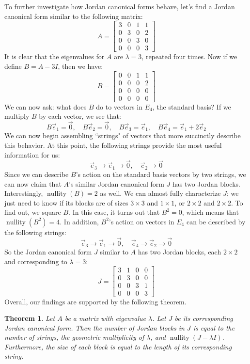 \documentclass[11pt]{amsart}
\newtheorem{theorem}{Theorem}[section]
\theoremstyle{definition}
\DeclareMathOperator{\nullity}{nullity}
\begin{document}
To further investigate how Jordan canonical forms behave, let's find a Jordan canonical form similar to the following matrix:
\[
	A = \begin{bmatrix} 3 & 0 & 1 & 1 \\ 0 & 3 & 0 & 2 \\ 0 & 0 & 3 & 0 \\ 0 & 0 & 0 & 3 \end{bmatrix}
\]
It is clear that the eigenvalues for $A$ are $\lambda = 3$, repeated four times. Now if we define $B = A - 3I$, then we have:
\[
	B = \begin{bmatrix} 0 & 0 & 1 & 1 \\ 0 & 0 & 0 & 2 \\ 0 & 0 & 0 & 0 \\ 0 & 0 & 0 & 0 \end{bmatrix}
\]
We can now ask: what does $B$ do to vectors in $E_4$, the standard basis? If we multiply $B$ by each vector, we see that:
\[
	B\vec{e}_1 = \vec{0}, \quad B\vec{e}_2 = \vec{0}, \quad B\vec{e}_3 = \vec{e}_1, \quad B\vec{e}_4 = \vec{e}_1 + 2\vec{e}_2
\] 
We can now begin assembling ``strings" of vectors that more succinctly describe this behavior. At this point, the following strings provide
the most useful information for us:
\[
	\vec{e}_3 \rightarrow \vec{e}_1 \rightarrow \vec{0}, \quad \vec{e}_2 \rightarrow \vec{0}
\]
Since we can describe $B$'s action on the standard basis vectors by two strings, we can now claim that $A$'s similar Jordan canonical
form $J$ has two Jordan blocks. Interestingly, $\nullity(B) = 2$ as well. We can almost fully characterize $J$; we just need to know if its blocks
are of sizes $3 \times 3$ and $1 \times 1$, or $2 \times 2$ and $2 \times 2$. To find out, we square $B$.
In this case, it turns out that $B^2 = 0$, which means that $\nullity(B^2) = 4$. In addition, $B^2$'s action on vectors in $E_4$ can be described
by the following strings:
\[
	\vec{e}_3 \rightarrow \vec{e}_1 \rightarrow \vec{0}, \quad \vec{e}_4 \rightarrow \vec{e}_2 \rightarrow \vec{0}
\]
So the Jordan canonical form $J$ similar to $A$ has two Jordan blocks, each $2 \times 2$ and corresponding to $\lambda = 3$:
\[
	J = \begin{bmatrix} 3 & 1 & 0 & 0 \\ 0 & 3 & 0 & 0 \\ 0 & 0 & 3 & 1 \\ 0 & 0 & 0 & 3 \end{bmatrix}
\]
Overall, our findings are supported by the following theorem.
\begin{theorem}
	Let $A$ be a matrix with eigenvalue $\lambda$. Let $J$ be its corresponding Jordan canonical form. Then the number of Jordan blocks in 
	$J$ is equal to the number of strings, the geometric multiplicity of $\lambda$, and $\nullity(J - \lambda I)$. Furthermore, the size of
	each block is equal to the length of its corresponding string.
\end{theorem}
\end{document}
